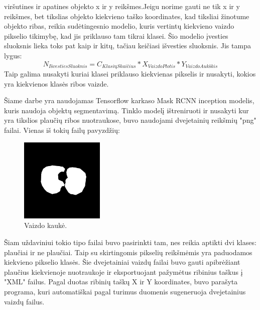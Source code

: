 \documentclass{VUMIFInfKursinis}
\begin{document}
viršutines ir apatines objekto x ir y reikšmes.Jeigu norime gauti ne tik x ir y reikšmes, bet tikslias
objekto kiekvieno taško koordinates, kad tiksliai žinotume objekto ribas, reikia sudėtingesnio modelio,
kuris vertintų kiekvieno vaizdo pikselio tikimybę, kad jis priklauso tam tikrai klasei.
Šio modelio įvesties sluoksnis lieka toks pat kaip ir kitų, tačiau keičiasi išvesties sluoksnis. Jis tampa
lygus:
\[
N_{IšvestiesSluoknis} = C_{KlasiųSkaičius} * X_{VaizdoPlotis} * Y_{VaizdoAukškis}
\]
Taip galima nusakyti kuriai klasei priklauso kiekvienas pikselis ir nusakyti, kokios yra
kiekvienos klasės ribos vaizde.
\par
Šiame darbe yra naudojamas Tensorflow karkaso Mask RCNN inception modelis, kuris naudoja
objektų segmentavimą. Tinklo modelį ištreniruoti ir nusakyti kur yra tikslios plaučių
ribos nuotraukose, buvo naudojami dvejetainių reikšmių "png" failai. Vienas iš tokių
failų pavyzdžių:

\begin{figure}[ht]
  \includegraphics[width=4cm,height=4cm,keepaspectratio]{mask.png}
  \caption{Vaizdo kaukė.}
  \label{fig:kaukė1}
\end{figure}

\par
Šiam uždaviniui tokio tipo failai buvo pasirinkti tam, nes reikia aptikti dvi klases:
plaučiai ir ne plaučiai. Taip su skirtingomis pikselių reikšmėmis yra paduodamos kiekvieno
pikselio klasės. Šie dvejetainiai vaizdų failai buvo gauti apibrėžiant plaučius kiekvienoje
nuotraukoje ir eksportuojant pažymėtus ribinius taškus į "XML" failus. Pagal duotas ribinių
taškų X ir Y koordinates, buvo parašyta programa, kuri automatiškai pagal turimus
duomenis sugeneruoja dvejetainius vaizdų failus.
\par








\end{document}
